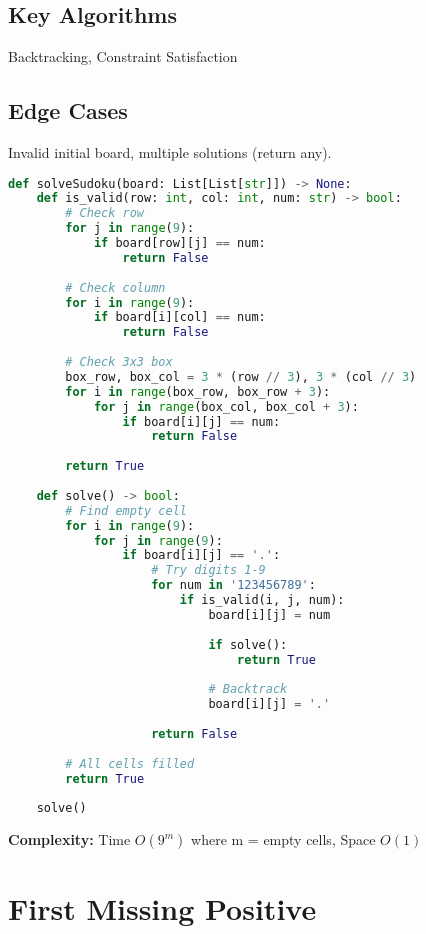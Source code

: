 \documentclass[10pt, a4paper]{article}
\begin{document}
\subsection*{Key Algorithms}
Backtracking, Constraint Satisfaction

\subsection*{Edge Cases}
Invalid initial board, multiple solutions (return any).

\begin{lstlisting}[language=Python]
def solveSudoku(board: List[List[str]]) -> None:
    def is_valid(row: int, col: int, num: str) -> bool:
        # Check row
        for j in range(9):
            if board[row][j] == num:
                return False
        
        # Check column
        for i in range(9):
            if board[i][col] == num:
                return False
        
        # Check 3x3 box
        box_row, box_col = 3 * (row // 3), 3 * (col // 3)
        for i in range(box_row, box_row + 3):
            for j in range(box_col, box_col + 3):
                if board[i][j] == num:
                    return False
        
        return True
    
    def solve() -> bool:
        # Find empty cell
        for i in range(9):
            for j in range(9):
                if board[i][j] == '.':
                    # Try digits 1-9
                    for num in '123456789':
                        if is_valid(i, j, num):
                            board[i][j] = num
                            
                            if solve():
                                return True
                            
                            # Backtrack
                            board[i][j] = '.'
                    
                    return False
        
        # All cells filled
        return True
    
    solve()
\end{lstlisting}
\textbf{Complexity:} Time $O(9^m)$ where m = empty cells, Space $O(1)$

\section{First Missing Positive}
\end{document}
